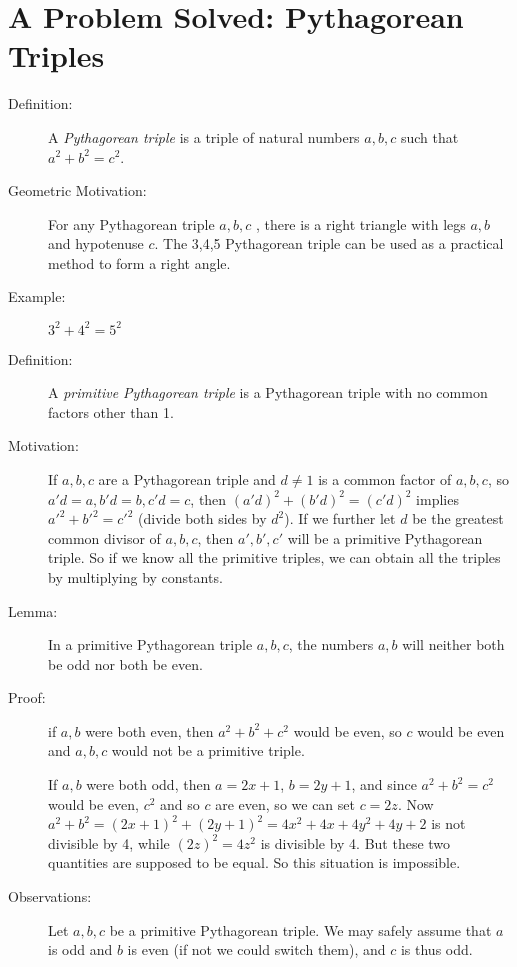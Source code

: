 \documentclass[12pt]{article}
\begin{document}
\section{A Problem Solved:  Pythagorean Triples}

\begin{description}

\item[Definition:]   A {\em Pythagorean triple\/} is a triple of natural numbers $a,b,c$ such that $a^2+b^2=c^2$.

\item[Geometric Motivation:]   For any Pythagorean triple $a,b,c$ , there is a right triangle with legs $a,b$  and hypotenuse $c$.  The 3,4,5 Pythagorean triple can be used as a practical method to form a right angle.

\item[Example:]  $3^2+4^2=5^2$

\item[Definition:]  A {\em primitive Pythagorean triple\/} is a Pythagorean triple with no common factors other than 1.

\item[Motivation:]  If $a,b,c$ are a Pythagorean triple and $d \neq 1$ is a common factor of $a,b,c$,
so $a'd=a, b'd=b, c'd=c$, then $(a'd)^2 + (b'd)^2 = (c'd)^2$ implies $a'^2+b'^2=c'^2$ (divide both sides by
$d^2$).   If we further let $d$ be the greatest common divisor of $a,b,c$, then $a',b',c'$ will be a primitive Pythagorean triple.   So if we know all the primitive triples, we can obtain all the triples by multiplying by constants.

\item[Lemma:]  In a primitive Pythagorean triple $a,b,c$, the numbers $a,b$ will neither both be odd nor both be even.

\item[Proof:]  if $a,b$ were both even, then $a^2+b^2+c^2$ would be even, so $c$ would be even and
$a,b,c$ would not be a primitive triple.

If $a,b$ were both odd, then $a=2x+1$, $b=2y+1$, and since $a^2+b^2=c^2$ would be even, $c^2$ and so $c$
are even, so we can set $c=2z$.   Now $a^2+b^2=(2x+1)^2+(2y+1)^2 = 4x^2+4x+4y^2+4y+2$ is not divisible by 4, while $(2z)^2= 4z^2$ is divisible by 4.  But these two quantities are supposed to be equal.  So this situation is impossible.

\item[Observations:]  Let $a,b,c$ be a primitive Pythagorean triple.   We may safely assume that $a$ is odd and $b$ is even (if not we could switch them), and $c$ is thus odd.


\end{description}
\end{document}
